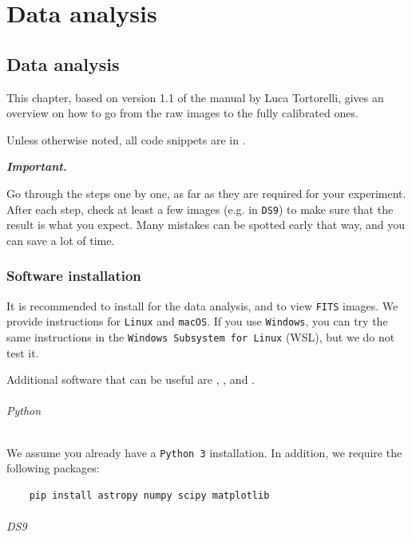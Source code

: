 \documentclass[a4paper, 11pt, fleqn]{memoir}
\newenvironment{important}{
    \begin{propBox}
        \textcolor{oneblue}{\textbf{\textit{Important.}}}
        }{
    \end{propBox}
}
\begin{document}
\part{Data analysis}

\chapter{Data analysis}
\label{section:data_red_steps}

This chapter, based on version 1.1 of the manual by Luca Tortorelli\autocite{Tortorelli2015_DataReduction}, gives an overview on how to go from the raw images to the fully calibrated ones.

Unless otherwise noted, all code snippets are in .

\begin{important}
    Go through the steps one by one, as far as they are required for your experiment.
    After each step, check at least a few images (e.g. in \texttt{DS9}) to make sure that the result is what you expect.
    Many mistakes can be spotted early that way, and you can save a lot of time.
\end{important}

\section{Software installation}
It is recommended to install  for the data analysis, and  to view \texttt{FITS} images.
We provide instructions for \texttt{Linux} and \texttt{macOS}.
If you use \texttt{Windows}, you can try the same instructions in the \texttt{Windows Subsystem for Linux} (WSL), but we do not test it.


Additional software that can be useful are , , and .

\paragraph*{Python}
We assume you already have a \texttt{Python 3} installation. In addition, we require the following packages:
\begin{verbatim}
    pip install astropy numpy scipy matplotlib
\end{verbatim}


\paragraph*{DS9}
\end{document}

